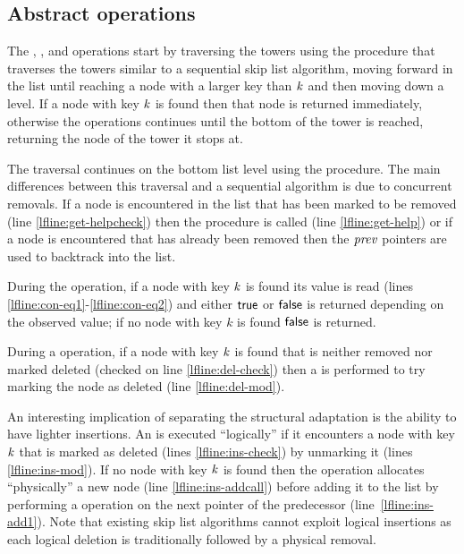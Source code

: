 \subsection{Abstract operations}\label{ssec:abs}
% 

The , , and  operations start by traversing the towers using the  procedure
that traverses the towers similar to a sequential skip list algorithm, moving forward in the list until reaching a node with a larger
key than $\ms{k}$ and then moving down a level.
If a node with key $\ms{k}$ is found then that node is returned immediately, otherwise the operations continues until the bottom of the tower is reached,
returning the node of the tower it stops at.

The traversal continues on the bottom list level using the  procedure.
The main differences between this traversal and a sequential algorithm is due to concurrent removals.
If a node is encountered in the list that has been marked to be removed (line \ref{lfline:get-helpcheck}) then
the  procedure is called (line \ref{lfline:get-help}) or if a node is encountered that has already been
removed then the $\ms{prev}$ pointers are used to backtrack into the list.

During the  operation, if a node with key $\ms{k}$ is found its value is read (lines \ref{lfline:con-eq1}-\ref{lfline:con-eq2}) and either $\lit{true}$ or $\lit{false}$ is returned depending on the observed value; if no node with key $k$ is found $\lit{false}$ is returned.

During a  operation, if a node with key $\ms{k}$ is found that is neither removed
nor marked deleted (checked on line \ref{lfline:del-check}) then a \CAS{} is performed to try marking the node as deleted (line \ref{lfline:del-mod}).

An interesting implication of separating the structural adaptation is the ability 
to have lighter insertions.
An  is executed ``logically'' if it encounters a node with key 
$\ms{k}$ that is marked
as deleted (lines \ref{lfline:ins-check}) by unmarking it (lines \ref{lfline:ins-mod}).
If no node with key $\ms{k}$ is found then the  operation allocates ``physically'' a new 
node (line \ref{lfline:ins-addcall}) before
adding it to the list by performing a \CAS{} operation on the next pointer of the predecessor 
(line~\ref{lfline:ins-add1}).
Note that existing skip list algorithms cannot exploit logical insertions as each logical deletion is 
traditionally followed by a physical removal.
 


